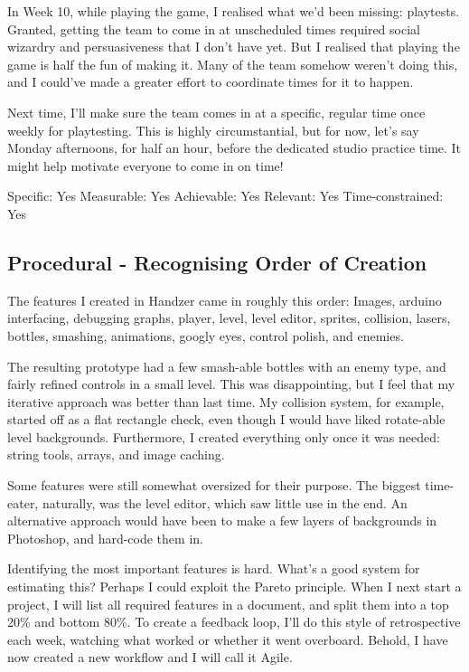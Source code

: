 \documentclass{scrartcl}
\begin{document}
In Week 10, while playing the game, I realised what we'd been missing: playtests. Granted, getting the team to come in at unscheduled times required social wizardry and persuasiveness that I don't have yet. But I realised that playing the game is half the fun of making it. Many of the team somehow weren't doing this, and I could've made a greater effort to coordinate times for it to happen.

Next time, I'll make sure the team comes in at a specific, regular time once weekly for playtesting. This is highly circumstantial, but for now, let's say Monday afternoons, for half an hour, before the dedicated studio practice time. It might help motivate everyone to come in on time!

Specific: Yes
Measurable: Yes
Achievable: Yes
Relevant: Yes
Time-constrained: Yes

\subsection{Procedural - Recognising Order of Creation} %
The features I created in Handzer came in roughly this order: Images, arduino interfacing, debugging graphs, player, level, level editor, sprites, collision, lasers, bottles, smashing, animations, googly eyes, control polish, and enemies.

The resulting prototype had a few smash-able bottles with an enemy type, and fairly refined controls in a small level. This was disappointing, but I feel that my iterative approach was better than last time. My collision system, for example, started off as a flat rectangle check, even though I would have liked rotate-able level backgrounds. Furthermore, I created everything only once it was needed: string tools, arrays, and image caching.

Some features were still somewhat oversized for their purpose. The biggest time-eater, naturally, was the level editor, which saw little use in the end. An alternative approach would have been to make a few layers of backgrounds in Photoshop, and hard-code them in.

Identifying the most important features is hard. What's a good system for estimating this? Perhaps I could exploit the Pareto principle. When I next start a project, I will list all required features in a document, and split them into a top 20\% and bottom 80\%. To create a feedback loop, I'll do this style of retrospective each week, watching what worked or whether it went overboard. Behold, I have now created a new workflow and I will call it Agile.
\end{document}
